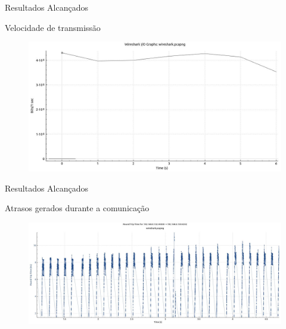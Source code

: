 \documentclass[10pt]{beamer}
\begin{document}
\begin{frame}{Resultados Alcançados}
	\begin{alertblock}{Velocidade de transmissão}
		\vspace{0.8cm}
		\begin{figure}[h]
			\begin{center}
				\includegraphics[scale=0.3]{imagens/speed.jpg}\\
			\end{center}
			\label{fig:speed}
		\end{figure}
	\end{alertblock}
\end{frame}

\begin{frame}{Resultados Alcançados}
	\begin{alertblock}{Atrasos gerados durante a comunicação}
		\vspace{0.8cm}
		\begin{figure}[h]
			\begin{center}
				\includegraphics[scale=0.23]{imagens/delay.jpg}\\
			\end{center}
			\label{fig:delay}
		\end{figure}
	\end{alertblock}
\end{frame}
\end{document}
